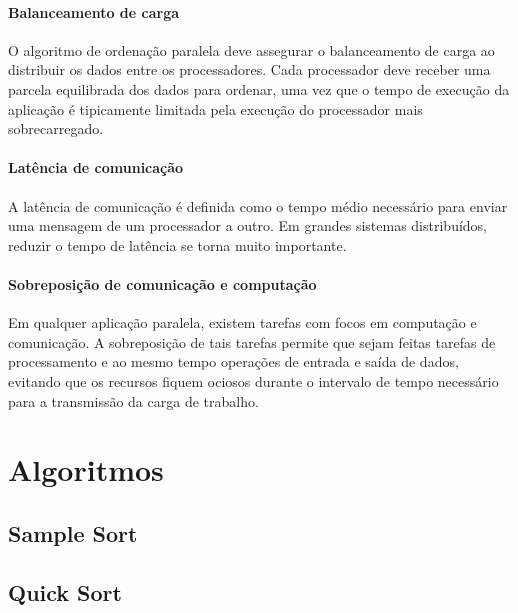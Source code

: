 \paragraph*{Balanceamento de carga} 
O algoritmo de ordenação paralela deve assegurar o balanceamento de carga ao distribuir os dados entre os processadores. Cada processador deve receber uma parcela equilibrada dos dados para ordenar, uma vez que o tempo de execução da aplicação é tipicamente limitada pela execução do processador mais sobrecarregado. 

\paragraph*{Latência de comunicação}
A latência de comunicação é definida como o tempo médio necessário para enviar uma mensagem de um processador a outro. 
Em grandes sistemas distribuídos, reduzir o tempo de latência se torna muito importante. 

\paragraph*{Sobreposição de comunicação e computação}
Em qualquer aplicação paralela, existem tarefas com focos em computação e comunicação. A sobreposição de tais tarefas permite que sejam feitas tarefas de processamento e ao mesmo tempo operações de entrada e saída de dados, evitando que os recursos fiquem ociosos durante o intervalo de tempo necessário para a transmissão da carga de trabalho. 

\section{Algoritmos}
\subsection{Sample Sort}
\subsection{Quick Sort}

